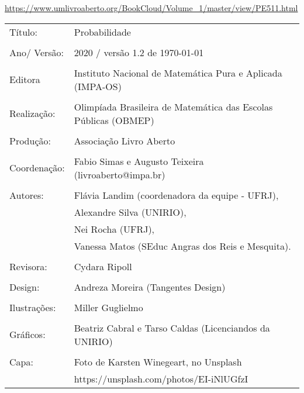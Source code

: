 \url{https://www.umlivroaberto.org/BookCloud/Volume_1/master/view/PE511.html}


\begin{tabular}{p{}p{}}
Título: & Probabilidade\\
\\
Ano/ Versão: & 2020 / versão 1.2 de \today\\
\\
Editora & Instituto Nacional de Matem\'atica Pura e Aplicada (IMPA-OS)\\
\\
Realização:& Olimp\'iada Brasileira de Matem\'atica das Escolas P\'ublicas (OBMEP)\\
\\
Produção:& Associação Livro Aberto\\
\\
Coordenação: & Fabio Simas e Augusto Teixeira (livroaberto@impa.br)\\
\\
  Autores: & Flávia Landim (coordenadora da equipe - UFRJ),\\
        & Alexandre Silva (UNIRIO),\\
        & Nei Rocha (UFRJ),\\
             & Vanessa Matos (SEduc Angras dos Reis e Mesquita).\\
\\
Revisora: &  Cydara Ripoll  \\
\\
Design: & Andreza Moreira (Tangentes Design) \\
\\
  Ilustrações: & Miller  Guglielmo \\ 
\\
Gráficos: & Beatriz Cabral e Tarso Caldas (Licenciandos da UNIRIO)\\
\\
  Capa: & Foto de Karsten Winegeart, no Unsplash \\
        & https://unsplash.com/photos/EI-iNlUGfzI \\

\end{tabular}

